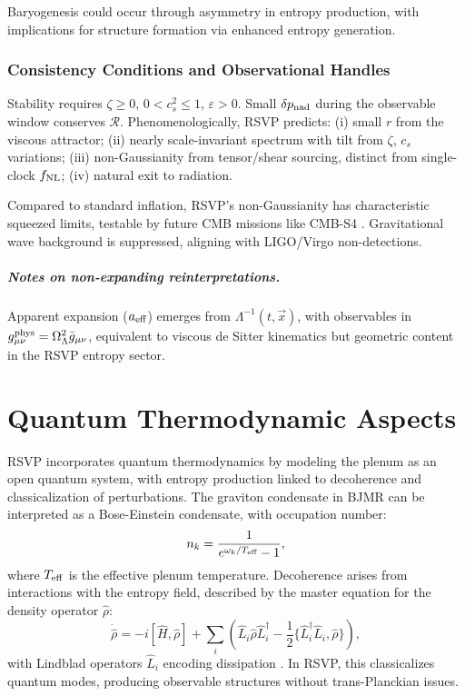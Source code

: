 \documentclass[12pt, a4paper, openany]{book}
\theoremstyle{definition}
\begin{document}
Baryogenesis could occur through asymmetry in entropy production, with implications for structure formation via enhanced entropy generation.

\subsection{Consistency Conditions and Observational Handles}
Stability requires $\zeta \ge 0$, $0 < c_s^2 \le 1$, $\varepsilon > 0$. Small $\delta p_{\rm nad}$ during the observable window conserves $\mathcal{R}$. Phenomenologically, RSVP predicts:
(i) small $r$ from the viscous attractor;
(ii) nearly scale-invariant spectrum with tilt from $\zeta$, $c_s$ variations;
(iii) non-Gaussianity from tensor/shear sourcing, distinct from single-clock $f_{\rm NL}$;
(iv) natural exit to radiation.

Compared to standard inflation, RSVP's non-Gaussianity has characteristic squeezed limits, testable by future CMB missions like CMB-S4 \citep{Abazajian:2016}. Gravitational wave background is suppressed, aligning with LIGO/Virgo non-detections.

\paragraph{Notes on non-expanding reinterpretations.}
Apparent expansion ($a_{\rm eff}$) emerges from $\Lambda^{-1}(t,\vec{x})$, with observables in $g^{\rm phys}_{\mu\nu} = \Omega_\Lambda^2 \bar{g}_{\mu\nu}$, equivalent to viscous de Sitter kinematics but geometric content in the RSVP entropy sector.

\chapter{Quantum Thermodynamic Aspects}
RSVP incorporates quantum thermodynamics by modeling the plenum as an open quantum system, with entropy production linked to decoherence and classicalization of perturbations. The graviton condensate in BJMR can be interpreted as a Bose-Einstein condensate, with occupation number:
\begin{equation}
n_k = \frac{1}{e^{\omega_k / T_{\rm eff}} - 1},
\end{equation}
where $T_{\rm eff}$ is the effective plenum temperature. Decoherence arises from interactions with the entropy field, described by the master equation for the density operator $\hat{\rho}$:
\begin{equation}
\dot{\hat{\rho}} = -i [\hat{H}, \hat{\rho}] + \sum_i \left( \hat{L}_i \hat{\rho} \hat{L}_i^\dagger - \frac{1}{2} \{\hat{L}_i^\dagger \hat{L}_i, \hat{\rho}\} \right),
\end{equation}
with Lindblad operators $\hat{L}_i$ encoding dissipation \citep{Breuer:2002}. In RSVP, this classicalizes quantum modes, producing observable structures without trans-Planckian issues.
\end{document}

